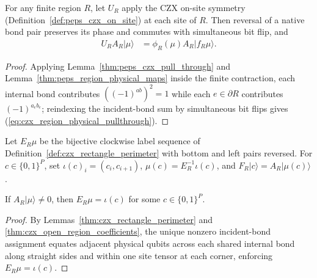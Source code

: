 \begin{lemma}%
    \label{thm:czx_region_physical_pullthrough}
    \leanok
    For any finite region $R$, let $U_R$ apply the CZX on-site symmetry
    (Definition~\ref{def:peps_czx_on_site}) at each site of $R$. Then reversal
    of a native bond pair preserves its phase and commutes with simultaneous
    bit flip, and
    \begin{align}
        U_RA_R|\mu\rangle & =\phi_R(\mu)A_R|f_R\mu\rangle.
        \label{eq:czx_region_physical_pullthrough}
    \end{align}
\end{lemma}
\begin{proof}\leanok
    Applying Lemma~\ref{thm:peps_czx_pull_through} and
    Lemma~\ref{thm:peps_region_physical_maps} inside the finite contraction,
    each internal bond contributes $((-1)^{ab})^2=1$ while each $e\in\partial R$
    contributes $(-1)^{a_eb_e}$; reindexing the incident-bond sum by simultaneous
    bit flips gives (\ref{eq:czx_region_physical_pullthrough}).
\end{proof}

\begin{definition}%
    \label{def:czx_rectangle_boundary_labels}
    \leanok
    Let $E_R\mu$ be the bijective clockwise label sequence of
    Definition~\ref{def:czx_rectangle_perimeter} with bottom and left pairs
    reversed. For $c\in\{0,1\}^P$, set $\iota(c)_i=(c_i,c_{i+1})$,
    $\mu(c)=E_R^{-1}\iota(c)$, and $F_R|c\rangle=A_R|\mu(c)\rangle$.
\end{definition}

\begin{lemma}%
    \label{thm:czx_rectangle_boundary_support}
    \leanok
    If $A_R|\mu\rangle\ne0$, then $E_R\mu=\iota(c)$ for some $c\in\{0,1\}^P$.
\end{lemma}
\begin{proof}\leanok
    By Lemmas~\ref{thm:czx_rectangle_perimeter} and
    \ref{thm:czx_open_region_coefficients}, the unique nonzero incident-bond
    assignment equates adjacent physical qubits across each shared internal
    bond along straight sides and within one site tensor at each corner,
    enforcing $E_R\mu=\iota(c)$.
\end{proof}

